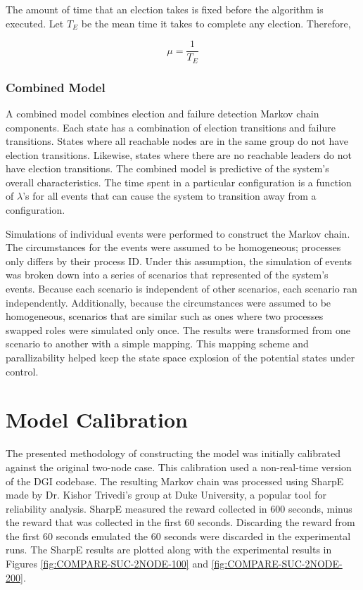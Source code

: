 The amount of time that an election takes is fixed before the algorithm is executed. 
Let $T_{E}$ be the mean time it takes to complete any election. Therefore,

\begin{equation}
\mu = \frac{1}{T_{E}}
\end{equation}

\subsubsection{Combined Model}

A combined model combines election and failure detection Markov chain components.
Each state has a combination of election transitions and failure transitions.
States where all reachable nodes are in the same group do not have election transitions.
Likewise, states where there are no reachable leaders do not have election transitions.                                                        
The combined model is predictive of the system's overall characteristics.
The time spent in a particular configuration is a function of $\lambda$'s for all events that can cause the system to transition away from a configuration. 

Simulations of individual events were performed to construct the Markov chain.
The circumstances for the events were assumed to be homogeneous; processes only differs by their process ID.
Under this assumption, the simulation of events was broken down into a series of scenarios that represented of the system's events.
Because each scenario is independent of other scenarios, each scenario ran independently.
Additionally, because the circumstances were assumed to be homogeneous, scenarios that are similar such as ones where two processes swapped roles were simulated only once. 
The results were transformed from one scenario to another with a simple mapping.
This mapping scheme and parallizability helped keep the state space explosion of the potential states under control.

\section{Model Calibration}

The presented methodology of constructing the model was initially calibrated against the original two-node case.
This calibration used a non-real-time version of the DGI codebase.
The resulting Markov chain was processed using SharpE \cite{SHARPE}\cite{SHARPE2} made by Dr. Kishor Trivedi's group at Duke University, a popular tool for reliability analysis.
SharpE measured the reward collected in 600 seconds, minus the reward that was collected in the first 60 seconds. 
Discarding the reward from the first 60 seconds emulated the 60 seconds were discarded in the experimental runs.
The SharpE results are plotted along with the experimental results in Figures \ref{fig:COMPARE-SUC-2NODE-100} and \ref{fig:COMPARE-SUC-2NODE-200}.

